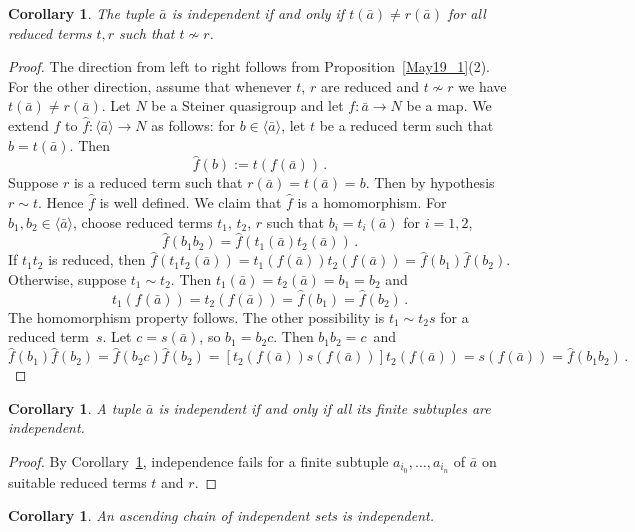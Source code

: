 \documentclass[a4paper, 11pt]{article}
\theoremstyle{note}
\newtheorem{cor}[thm]{Corollary}
\begin{document}
	\begin{cor}\label{May19_3}  The tuple $\bar{a}$ is independent if and only if $t(\bar{a})\neq r(\bar{a})$ for all reduced terms $t,r$ such that $t\not\sim r$.
	\end{cor}
	\begin{proof} The direction from left to right follows from  Proposition~\ref{May19_1}(2). For the other direction, assume that whenever $t$, $r$ are reduced and $t \not\sim r$ we have $t(\bar{a})\neq r(\bar{a})$. Let $N$ be a Steiner quasigroup and let $f: \bar{a} \to N$ be a map. We extend $f$ to $\hat{f} : \langle \bar{a} \rangle \to N$ as follows: for $b \in \langle \bar{a} \rangle$, let $t$ be a reduced term such that $b=t(\bar{a})$. Then
		\[ \hat{f}(b):= t(f(\bar{a})) \,.\]
		Suppose $r$ is a reduced term such that $r(\bar{a})=t(\bar{a}) = b$. Then by hypothesis $r \sim t$. Hence $\hat{f}$ is well defined. We claim that $\hat{f}$ is a homomorphism. 
		For $b_1, b_2 \in \langle \bar{a} \rangle$, choose reduced terms $t_1$, $t_2$, $r$ such that $b_i=t_i(\bar{a})$ for $i=1,2$, %
		\[ \hat{f}(b_1b_2) = \hat{f}(t_1(\bar{a})t_2(\bar{a})) \, . \]
		If $t_1t_2$ is reduced, then $\hat{f}(t_1t_2(\bar{a}))= t_1(f(\bar{a})) t_2(f(\bar{a}))= \hat{f}(b_1)\hat{f}(b_2)$. 
		Otherwise, suppose $t_1 \sim t_2$. Then 
		$t_1(\bar{a})=t_2(\bar{a})=b_1=b_2$ and 
		\[t_1(f(\bar{a}))=t_2(f(\bar{a}))=\hat{f}(b_1)=\hat{f}(b_2) \,. \]
		The homomorphism property follows.
		The other possibility is $t_1 \sim t_2s$ for a reduced term~$s$. Let $c=s(\bar{a})$, so $b_1=b_2c$. Then
		$b_1b_2=c \,$
		and 
		\[\hat{f}(b_1)\hat{f}(b_2)= \hat{f}(b_2c)\hat{f}(b_2)= [t_2(f(\bar{a}))s(f(\bar{a}))]t_2(f(\bar{a}))=s(f(\bar{a}))=\hat{f}(b_1b_2) \, . \] 
				
	\end{proof}

	
	\begin{cor} \label{May19_5} A tuple $\bar{a}$ is independent if and only if all its finite subtuples are independent. \end{cor}
	\begin{proof} By Corollary~\ref{May19_3}, independence fails for a finite subtuple $a_{i_0}, \ldots, a_{i_n}$ of $\bar{a}$ on suitable reduced terms $t$ and $r$.
	\end{proof}
	
	\begin{cor}\label{May19_4} An ascending chain of independent sets is independent.  
	\end{cor}
	
\end{document}
